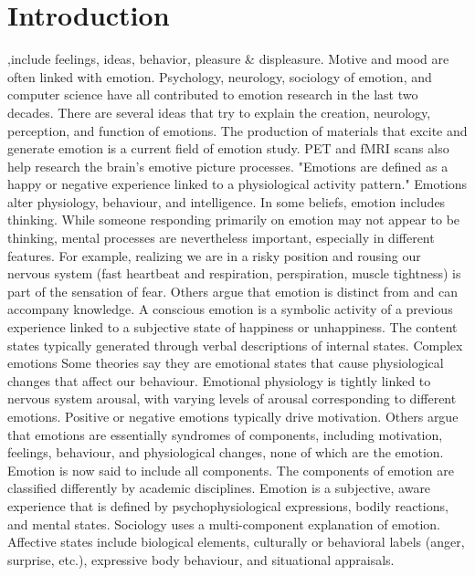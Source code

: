 \documentclass{ieeeaccess}
\begin{document}
\titlepgskip=-15pt
\maketitle

\section{Introduction}
\label{sec:introduction}
,include feelings, ideas, behavior, pleasure & displeasure. Motive and mood are often linked with emotion.
Psychology, neurology, sociology of emotion, and computer science have all contributed to emotion research in the last two decades. There are several ideas that try to explain the creation, neurology, perception, and function of emotions. The production of materials that excite and generate emotion is a current field of emotion study. PET and fMRI scans also help research the brain's emotive picture processes.
"Emotions are defined as a happy or negative experience linked to a physiological activity pattern." Emotions alter physiology, behaviour, and intelligence. 
In some beliefs, emotion includes thinking. While someone responding primarily on emotion may not appear to be thinking, mental processes are nevertheless important, especially in different features. For example, realizing we are in a risky position and rousing our nervous system (fast heartbeat and respiration, perspiration, muscle tightness) is part of the sensation of fear. Others argue that emotion is distinct from and can accompany knowledge. A conscious emotion is a symbolic activity of a previous experience linked to a subjective state of happiness or unhappiness. The content states typically generated through verbal descriptions of internal states.
Complex emotions Some theories say they are emotional states that cause physiological changes that affect our behaviour. Emotional physiology is tightly linked to nervous system arousal, with varying levels of arousal corresponding to different emotions.  Positive or negative emotions typically drive motivation. Others argue that emotions are essentially syndromes of components, including motivation, feelings, behaviour, and physiological changes, none of which are the emotion. Emotion is now said to include all components. The components of emotion are classified differently by academic disciplines. Emotion is a subjective, aware experience that is defined by psychophysiological expressions, bodily reactions, and mental states. Sociology uses a multi-component explanation of emotion. Affective states include biological elements, culturally or behavioral labels (anger, surprise, etc.), expressive body behaviour, and situational appraisals.
\end{document}
